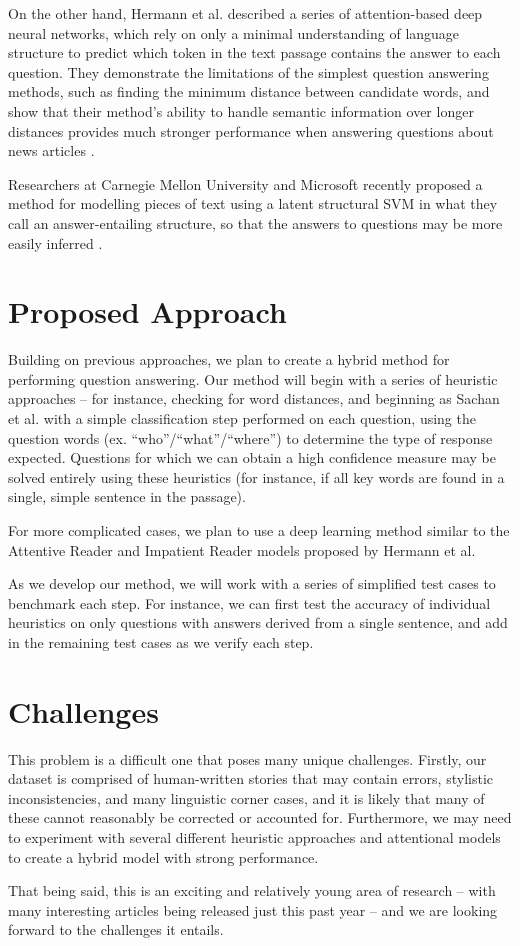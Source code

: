 \documentclass[]{scrartcl}
\begin{document}
On the other hand, Hermann et al. described a series of attention-based deep neural networks, which rely on only a minimal understanding of language structure to predict which token in the text passage contains the answer to each question.  They demonstrate the limitations of the simplest question answering methods, such as finding the minimum distance between candidate words, and show that their method's ability to handle semantic information over longer distances provides much stronger performance when answering questions about news articles \cite{NIPS2015}.

Researchers at Carnegie Mellon University and Microsoft recently proposed a method for modelling pieces of text using a latent structural SVM in what they call an answer-entailing structure, so that the answers to questions may be more easily inferred \cite{sachan2015learning}.

\section{Proposed Approach}
Building on previous approaches, we plan to create a hybrid method for performing question answering.  Our method will begin with a series of heuristic approaches – for instance, checking for word distances, and beginning as Sachan et al. with a simple classification step performed on each question, using the question words (ex. ``who''/``what''/``where'') to determine the type of response expected.  Questions for which we can obtain a high confidence measure may be solved entirely using these heuristics (for instance, if all key words are found in a single, simple sentence in the passage).

For more complicated cases, we plan to use a deep learning method similar to the Attentive Reader and Impatient Reader models proposed by Hermann et al. 

As we develop our method, we will work with a series of simplified test cases to benchmark each step.  For instance, we can first test the accuracy of individual heuristics on only questions with answers derived from a single sentence, and add in the remaining test cases as we verify each step.

\section{Challenges}
This problem is a difficult one that poses many unique challenges.  Firstly, our dataset is comprised of human-written stories that may contain errors, stylistic inconsistencies, and many linguistic corner cases, and it is likely that many of these cannot reasonably be corrected or accounted for.  Furthermore, we may need to experiment with several different heuristic approaches and attentional models to create a hybrid model with strong performance.

That being said, this is an exciting and relatively young area of research -- with many interesting articles being released just this past year -- and we are looking forward to the challenges it entails.



\end{document}
